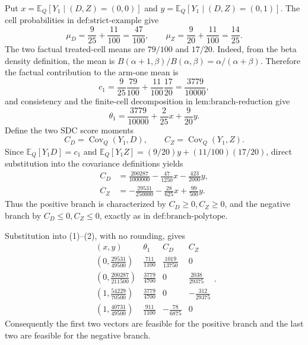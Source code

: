 Put \(x=\mathbb E_Q[Y_1\mid(D,Z)=(0,0)]\) and \(y=\mathbb E_Q[Y_1\mid(D,Z)=(0,1)]\).  The cell probabilities in \(\text{def:strict-example}\) give
\[
 \mu_D=\frac{9}{25}+\frac{11}{100}=\frac{47}{100},
 \qquad
 \mu_Z=\frac{9}{20}+\frac{11}{100}=\frac{14}{25}.
\]
The two factual treated-cell means are \(79/100\) and \(17/20\).  Indeed, from the beta density definition, the mean is
\(B(\alpha+1,\beta)/B(\alpha,\beta)=\alpha/(\alpha+\beta)\).  Therefore the factual contribution to the arm-one mean is
\[
 c_1=\frac{9}{25}\frac{79}{100}+\frac{11}{100}\frac{17}{20}
     =\frac{3779}{10000},
\]
and consistency and the finite-cell decomposition in \(\text{lem:branch-reduction}\) give
\[
 \theta_1=\frac{3779}{10000}+\frac{2}{25}x+\frac{9}{20}y. \tag{1}
\]
Define the two SDC score moments
\[
 C_D=\operatorname{Cov}_Q(Y_1,D),
 \qquad C_Z=\operatorname{Cov}_Q(Y_1,Z).
\]
Since \(\mathbb E_Q[Y_1D]=c_1\) and
\(\mathbb E_Q[Y_1Z]=(9/20)y+(11/100)(17/20)\), direct substitution into the covariance definitions yields
\[
 \begin{aligned}
 C_D
   &=\frac{200287}{1000000}-\frac{47}{1250}x-\frac{423}{2000}y,\\
 C_Z
   &=-\frac{29531}{250000}-\frac{28}{625}x+\frac{99}{500}y.
 \end{aligned} \tag{2}
\]
Thus the positive branch is characterized by \(C_D\geq0,C_Z\geq0\), and the negative branch by \(C_D\leq0,C_Z\leq0\), exactly as in \(\text{def:branch-polytope}\).

Substitution into (1)--(2), with no rounding, gives
\[
\begin{array}{c|c|c|c}
(x,y)&\theta_1&C_D&C_Z\\ \hline
\left(0,\frac{29531}{49500}\right)&\frac{711}{1100}&\frac{1019}{13750}&0\\[2pt]
\left(0,\frac{200287}{211500}\right)&\frac{3779}{4700}&0&\frac{2038}{29375}\\[2pt]
\left(1,\frac{54229}{70500}\right)&\frac{3779}{4700}&0&-\frac{312}{29375}\\[2pt]
\left(1,\frac{40731}{49500}\right)&\frac{911}{1100}&-\frac{78}{6875}&0
\end{array}. \tag{3}
\]
Consequently the first two vectors are feasible for the positive branch and the last two are feasible for the negative branch.

